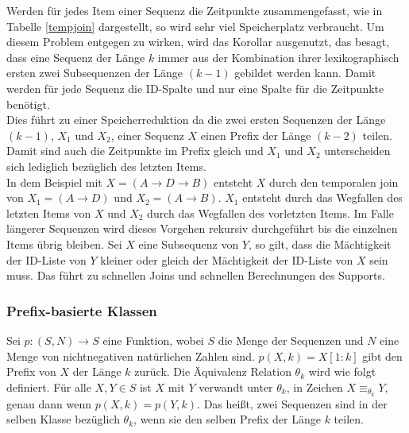 \noindent Werden für jedes Item einer Sequenz die Zeitpunkte zusammengefasst, wie in Tabelle \ref{tempjoin} dargestellt, so wird sehr viel Speicherplatz verbraucht. Um diesem Problem entgegen zu wirken, wird das Korollar ausgenutzt, das besagt, dass eine Sequenz der Länge $k$ immer aus der Kombination ihrer lexikographisch ersten zwei Subsequenzen der Länge $(k-1)$ gebildet werden kann. Damit werden für jede Sequenz die ID-Spalte und nur eine Spalte für die Zeitpunkte benötigt.\\
Dies führt zu einer Speicherreduktion da die zwei ersten Sequenzen der Länge $(k-1)$, $X_1$ und $X_2$, einer Sequenz $X$ einen Prefix der Länge $(k-2)$ teilen. Damit sind auch die Zeitpunkte im Prefix gleich und $X_1$ und $X_2$ unterscheiden sich lediglich bezüglich des letzten Items.\\
In dem Beispiel mit $X=(A\rightarrow D\rightarrow B)$ entsteht $X$ durch den temporalen join von $X_1=(A\rightarrow D)$ und $X_2=(A\rightarrow B)$. $X_1$ entsteht durch das Wegfallen des letzten Items von $X$ und $X_2$ durch das Wegfallen des vorletzten Items. Im Falle längerer Sequenzen wird dieses Vorgehen rekursiv durchgeführt bis die einzelnen Items übrig bleiben. Sei $X$ eine Subsequenz von $Y$, so gilt, dass die Mächtigkeit der ID-Liste von $Y$ kleiner oder gleich der Mächtigkeit der ID-Liste von $X$ sein muss. Das führt zu schnellen Joins und schnellen Berechnungen des Supports.

\subsubsection*{Prefix-basierte Klassen}
Sei $p:(S,N)\rightarrow S$ eine Funktion, wobei $S$ die Menge der Sequenzen und $N$ eine Menge von nichtnegativen natürlichen Zahlen sind. $p(X,k)=X[1:k]$ gibt den Prefix von $X$ der Länge $k$ zurück. Die Äquivalenz Relation $\theta_k$ wird wie folgt definiert. Für alle $X,Y \in S$ ist $X$ mit $Y$ verwandt unter $\theta_k$, in Zeichen $X\equiv_{\theta_k} Y$, genau dann wenn $p(X,k)=p(Y,k)$. Das heißt, zwei Sequenzen sind in der selben Klasse bezüglich $\theta_k$, wenn sie den selben Prefix der Länge $k$ teilen.


